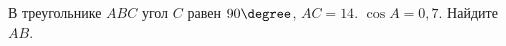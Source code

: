 \begin{ex}
	\begin{condition}
		В треугольнике \( ABC \) угол \( C \) равен \( 90 \degree \), \( AC=14 \).  \( \cos A=0,7 \). Найдите \( AB \).
	\end{condition}
\end{ex}